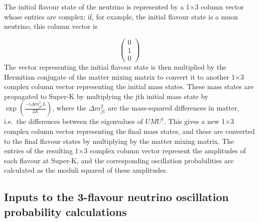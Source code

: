 The initial flavour state of the neutrino is represented by a 1$\times$3 column vector whose entries are complex; if, for 
example, the initial flavour state is a muon neutrino, this column vector is 

\begin{displaymath}
\left(
\begin{array}{c}
0 \\
1 \\
0 
\end{array} \right)
\end{displaymath}
The vector representing the initial flavour state is then multiplied by the Hermitian conjugate of the matter mixing matrix 
to convert it to another 1$\times$3 complex column vector representing the initial mass states. These mass states are propagated 
to Super-K by multiplying the jth initial mass state by $\exp \left(\frac{-i \Delta m_{j1}^{2}L}{2E} \right)$, where the 
$\Delta m_{j1}^{2}$ are the mass-squared differences in matter, i.e.\ the differences between the eigenvalues of $U M U^{\dagger}$. 
This gives a new 1$\times$3 complex column vector representing the final mass states, and these are converted to the final flavour 
states by multiplying by the matter mixing matrix. The entries of the resulting 1$\times$3 complex column vector represent the 
amplitudes of each flavour at Super-K, and the corresponding oscillation probabilities are calculated as the moduli squared of these 
amplitudes.  

\subsection{Inputs to the 3-flavour neutrino oscillation probability calculations}


